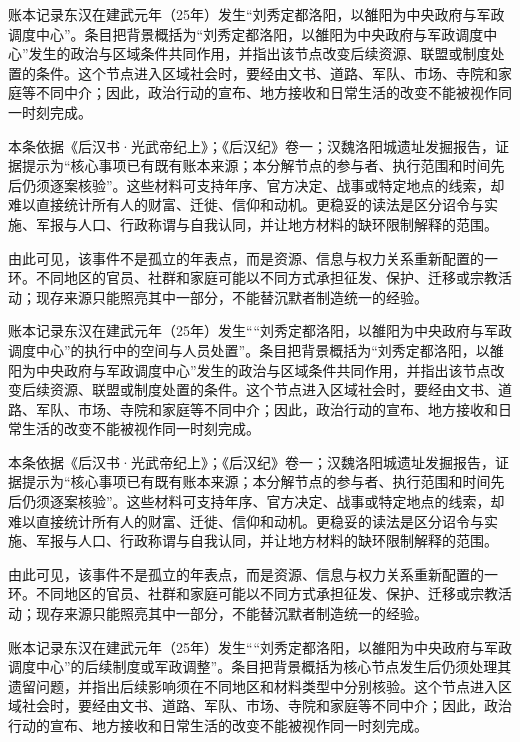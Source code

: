 账本记录东汉在建武元年（25年）发生“刘秀定都洛阳，以雒阳为中央政府与军政调度中心”。条目把背景概括为“刘秀定都洛阳，以雒阳为中央政府与军政调度中心”发生的政治与区域条件共同作用，并指出该节点改变后续资源、联盟或制度处置的条件。这个节点进入区域社会时，要经由文书、道路、军队、市场、寺院和家庭等不同中介；因此，政治行动的宣布、地方接收和日常生活的改变不能被视作同一时刻完成。

本条依据《后汉书·光武帝纪上》；《后汉纪》卷一；汉魏洛阳城遗址发掘报告，证据提示为“核心事项已有既有账本来源；本分解节点的参与者、执行范围和时间先后仍须逐案核验”。这些材料可支持年序、官方决定、战事或特定地点的线索，却难以直接统计所有人的财富、迁徙、信仰和动机。更稳妥的读法是区分诏令与实施、军报与人口、行政称谓与自我认同，并让地方材料的缺环限制解释的范围。

由此可见，该事件不是孤立的年表点，而是资源、信息与权力关系重新配置的一环。不同地区的官员、社群和家庭可能以不同方式承担征发、保护、迁移或宗教活动；现存来源只能照亮其中一部分，不能替沉默者制造统一的经验。

账本记录东汉在建武元年（25年）发生““刘秀定都洛阳，以雒阳为中央政府与军政调度中心”的执行中的空间与人员处置”。条目把背景概括为“刘秀定都洛阳，以雒阳为中央政府与军政调度中心”发生的政治与区域条件共同作用，并指出该节点改变后续资源、联盟或制度处置的条件。这个节点进入区域社会时，要经由文书、道路、军队、市场、寺院和家庭等不同中介；因此，政治行动的宣布、地方接收和日常生活的改变不能被视作同一时刻完成。

本条依据《后汉书·光武帝纪上》；《后汉纪》卷一；汉魏洛阳城遗址发掘报告，证据提示为“核心事项已有既有账本来源；本分解节点的参与者、执行范围和时间先后仍须逐案核验”。这些材料可支持年序、官方决定、战事或特定地点的线索，却难以直接统计所有人的财富、迁徙、信仰和动机。更稳妥的读法是区分诏令与实施、军报与人口、行政称谓与自我认同，并让地方材料的缺环限制解释的范围。

由此可见，该事件不是孤立的年表点，而是资源、信息与权力关系重新配置的一环。不同地区的官员、社群和家庭可能以不同方式承担征发、保护、迁移或宗教活动；现存来源只能照亮其中一部分，不能替沉默者制造统一的经验。

账本记录东汉在建武元年（25年）发生““刘秀定都洛阳，以雒阳为中央政府与军政调度中心”的后续制度或军政调整”。条目把背景概括为核心节点发生后仍须处理其遗留问题，并指出后续影响须在不同地区和材料类型中分别核验。这个节点进入区域社会时，要经由文书、道路、军队、市场、寺院和家庭等不同中介；因此，政治行动的宣布、地方接收和日常生活的改变不能被视作同一时刻完成。

